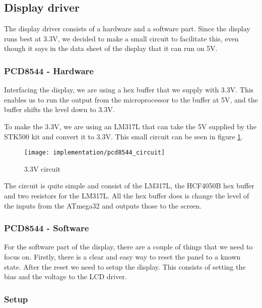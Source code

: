 \subsection{Display driver}

The display driver consists of a hardware and a software part. Since the display runs best at 3.3V, we decided to make a small circuit to facilitate this, even though it says in the data sheet of the display\cite[p. 17]{philips:pcd8544} that it can run on 5V.

\subsubsection{PCD8544 - Hardware}

Interfacing the display, we are using a hex buffer that we supply with 3.3V. This enables us to run the output from the microprocessor to the buffer at 5V, and the buffer shifts the level down to 3.3V\cite[p. 1]{STMicroelectronics:HCF4050B}.

To make the 3.3V, we are using an LM317L that can take the 5V supplied by the STK500 kit and convert it to 3.3V. This small circuit can be seen in figure \ref{fig:pcd8544_circuit}.

\begin{figure}
	\centering
	\texttt{[image: implementation/pcd8544\_circuit]}
	\caption{3.3V circuit}
	\label{fig:pcd8544_circuit}
\end{figure}

The circuit is quite simple and consist of the LM317L, the HCF4050B hex buffer and two resistors for the LM317L. All the hex buffer does is change the level of the inputs from the ATmega32 and outputs those to the screen.

\subsubsection{PCD8544 - Software}

For the software part of the display, there are a couple of things that we need to focus on. Firstly, there is a clear and easy way to reset the panel to a known state. After the reset we need to setup the display. 
This consists of setting the bias and the voltage to the LCD driver.

\subsubsection{Setup}

